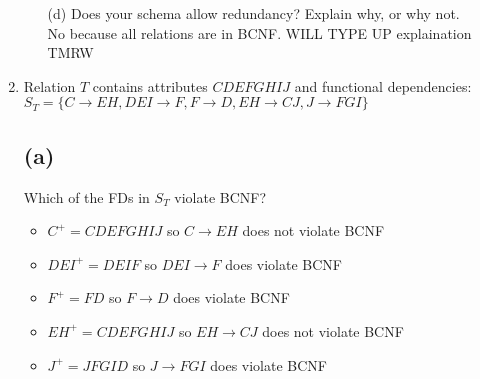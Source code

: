 \documentclass[12pt]{article}
\begin{document}
\begin{enumerate}
\begin{itemize}
    \item[(d)] Does your schema allow redundancy? Explain why, or why not. \\[5pt]
    No because all relations are in BCNF. WILL TYPE UP explaination TMRW
  \end{itemize}
  \newpage
  \item Relation $T$ contains attributes $CDEFGHIJ$ and functional dependencies:\newline
$S_T = \{ C \rightarrow EH, DEI \rightarrow F, F \rightarrow D, EH \rightarrow CJ, J \rightarrow FGI\}$
\subsection*{(a)}
Which of the FDs in $S_T$ violate BCNF?

\begin{itemize}
    \item $C^+ = CDEFGHIJ$   \; so $C \rightarrow EH$ does not violate BCNF
    \item $DEI^+ = DEIF$     \; so $DEI \rightarrow F$ does violate BCNF
    \item $F^+ = FD$         \; so $F \rightarrow D$ does violate BCNF
    \item $EH^+ = CDEFGHIJ$  \; so $EH \rightarrow CJ$ does not violate BCNF
    \item $J^+ = JFGID$    \; so $J \rightarrow FGI$ does violate BCNF 
\end{itemize}

\end{enumerate}
\end{document}
